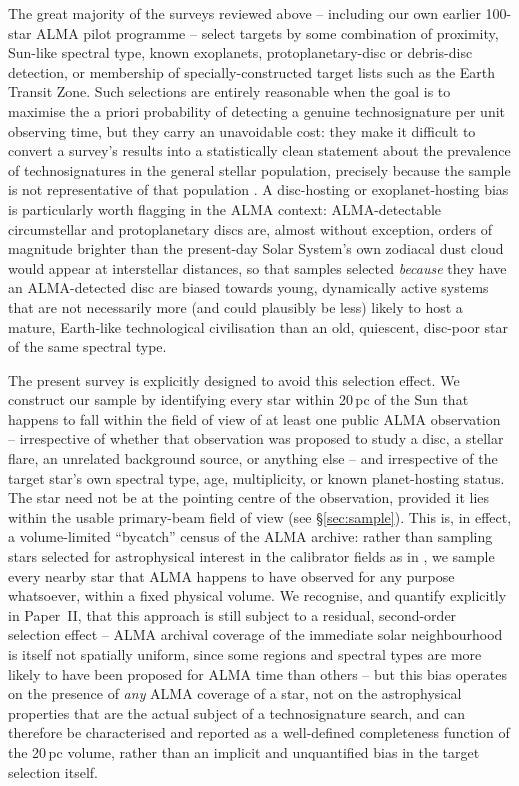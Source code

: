 \documentclass{openjournal}
\begin{document}
The great majority of the surveys reviewed above -- including our own earlier
100-star ALMA pilot programme -- select targets by some combination of proximity,
Sun-like spectral type, known exoplanets, protoplanetary-disc or debris-disc
detection, or membership of specially-constructed target lists such as the Earth
Transit Zone. Such selections are entirely reasonable when the goal is to
maximise the a priori probability of detecting a genuine technosignature per
unit observing time, but they carry an unavoidable cost: they make it difficult
to convert a survey's results into a statistically clean statement about the
prevalence of technosignatures in the general stellar population, precisely
because the sample is not representative of that population
\citep{Margot2023}. A disc-hosting or exoplanet-hosting bias is particularly
worth flagging in the ALMA context: ALMA-detectable circumstellar and
protoplanetary discs are, almost without exception, orders of magnitude brighter
than the present-day Solar System's own zodiacal dust cloud would appear at
interstellar distances, so that samples selected \emph{because} they have an
ALMA-detected disc are biased towards young, dynamically active systems that are
not necessarily more (and could plausibly be less) likely to host a mature,
Earth-like technological civilisation than an old, quiescent, disc-poor star of
the same spectral type.

The present survey is explicitly designed to avoid this selection effect. We
construct our sample by identifying every star within 20\,pc of the Sun that
happens to fall within the field of view of at least one public ALMA
observation -- irrespective of whether that observation was proposed to study a
disc, a stellar flare, an unrelated background source, or anything else -- and
irrespective of the target star's own spectral type, age, multiplicity, or known
planet-hosting status. The star need not be at the pointing centre of the
observation, provided it lies within the usable primary-beam field of view (see
\S\ref{sec:sample}). This is, in effect, a volume-limited ``bycatch'' census of
the ALMA archive: rather than sampling stars selected for astrophysical interest
in the calibrator fields as in \citet{Mason2024}, we sample every nearby star
that ALMA happens to have observed for any purpose whatsoever, within a fixed
physical volume. We recognise, and quantify explicitly in Paper~II, that this
approach is still subject to a residual, second-order selection effect -- ALMA
archival coverage of the immediate solar neighbourhood is itself not spatially
uniform, since some regions and spectral types are more likely to have been
proposed for ALMA time than others -- but this bias operates on the presence of
\emph{any} ALMA coverage of a star, not on the astrophysical properties that are
the actual subject of a technosignature search, and can therefore be
characterised and reported as a well-defined completeness function of the
20\,pc volume, rather than an implicit and unquantified bias in the target
selection itself.
\end{document}
